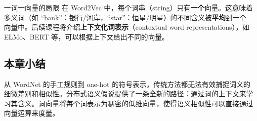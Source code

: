 \begin{warningbox}{一词一向量的局限}
在 Word2Vec 中，每个词串（string）只有\textbf{一个}向量。这意味着多义词（如 ``bank''：银行/河岸，``star''：恒星/明星）的不同含义被\textbf{平均}到一个向量中。后续课程将介绍\textbf{上下文化词表示}（contextual word representations），如 ELMo、BERT 等，可以根据上下文给出不同的向量。
\end{warningbox}

\subsection{本章小结}

从 WordNet 的手工规则到 one-hot 的符号表示，传统方法都无法有效捕捉词义的细微差别和相似性。分布式语义假说提供了一条全新的路径：通过词的上下文来学习其含义。词向量将每个词表示为稠密的低维向量，使得语义相似性可以直接通过向量运算来度量。


